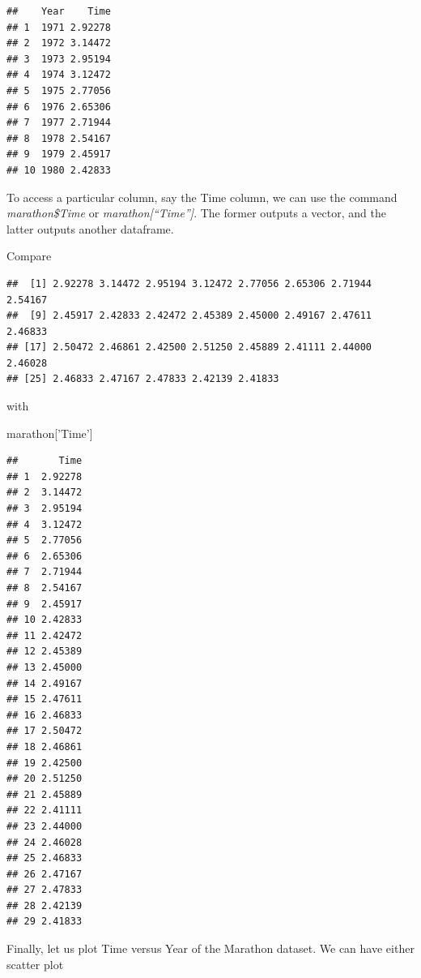 \documentclass[]{article}
\newenvironment{Shaded}{\begin{snugshade}}{\end{snugshade}}
\newcommand{\KeywordTok}[1]{\textcolor[rgb]{0.13,0.29,0.53}{\textbf{#1}}}
\newcommand{\NormalTok}[1]{#1}
\newcommand{\OperatorTok}[1]{\textcolor[rgb]{0.81,0.36,0.00}{\textbf{#1}}}
\newcommand{\StringTok}[1]{\textcolor[rgb]{0.31,0.60,0.02}{#1}}
\begin{document}
\begin{verbatim}
##    Year    Time
## 1  1971 2.92278
## 2  1972 3.14472
## 3  1973 2.95194
## 4  1974 3.12472
## 5  1975 2.77056
## 6  1976 2.65306
## 7  1977 2.71944
## 8  1978 2.54167
## 9  1979 2.45917
## 10 1980 2.42833
\end{verbatim}

To access a particular column, say the Time column, we can use the
command \emph{marathon\$Time} or \emph{marathon{[}``Time''{]}}. The
former outputs a vector, and the latter outputs another dataframe.

Compare

\begin{Shaded}
\end{Shaded}

\begin{verbatim}
##  [1] 2.92278 3.14472 2.95194 3.12472 2.77056 2.65306 2.71944 2.54167
##  [9] 2.45917 2.42833 2.42472 2.45389 2.45000 2.49167 2.47611 2.46833
## [17] 2.50472 2.46861 2.42500 2.51250 2.45889 2.41111 2.44000 2.46028
## [25] 2.46833 2.47167 2.47833 2.42139 2.41833
\end{verbatim}

with

\begin{Shaded}
\begin{Highlighting}[]
\NormalTok{marathon[}\StringTok{'Time'}\NormalTok{]}
\end{Highlighting}
\end{Shaded}

\begin{verbatim}
##       Time
## 1  2.92278
## 2  3.14472
## 3  2.95194
## 4  3.12472
## 5  2.77056
## 6  2.65306
## 7  2.71944
## 8  2.54167
## 9  2.45917
## 10 2.42833
## 11 2.42472
## 12 2.45389
## 13 2.45000
## 14 2.49167
## 15 2.47611
## 16 2.46833
## 17 2.50472
## 18 2.46861
## 19 2.42500
## 20 2.51250
## 21 2.45889
## 22 2.41111
## 23 2.44000
## 24 2.46028
## 25 2.46833
## 26 2.47167
## 27 2.47833
## 28 2.42139
## 29 2.41833
\end{verbatim}

Finally, let us plot Time versus Year of the Marathon dataset. We can
have either scatter plot

\begin{Shaded}
\end{Shaded}
\end{document}
